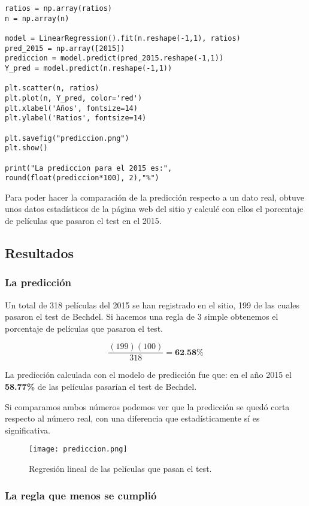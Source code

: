 \documentclass{article}
\begin{document}
\begin{lstlisting}
ratios = np.array(ratios)
n = np.array(n)

model = LinearRegression().fit(n.reshape(-1,1), ratios)
pred_2015 = np.array([2015]) 
prediccion = model.predict(pred_2015.reshape(-1,1))
Y_pred = model.predict(n.reshape(-1,1))

plt.scatter(n, ratios)
plt.plot(n, Y_pred, color='red')
plt.xlabel('Años', fontsize=14)
plt.ylabel('Ratios', fontsize=14)

plt.savefig("prediccion.png")
plt.show()

print("La prediccion para el 2015 es:",
round(float(prediccion*100), 2),"%")
\end{lstlisting}

Para poder hacer la comparación de la predicción respecto a un dato real, obtuve unos datos estadísticos de la página web del sitio \cite{pag} y calculé con ellos el porcentaje de películas que pasaron el test en el 2015.

\subsection{Resultados}\label{res}

\subsubsection{La predicción}

Un total de 318 películas del 2015 se han registrado en el sitio, 199 de las cuales pasaron el test de Bechdel. Si hacemos una regla de 3 simple obtenemos el porcentaje de películas que pasaron el test.

\begin{equation*}
    \frac{(199)(100)}{318} = \textbf{62.58\%}
\end{equation*}

La predicción calculada con el modelo de predicción fue que: en el año 2015 el \textbf{58.77\%} de las películas pasarían el test de Bechdel.

Si comparamos ambos números podemos ver que la predicción se quedó corta respecto al número real, con una diferencia que estadísticamente sí es significativa.

\begin{figure}[h!]
\centering
\texttt{[image: prediccion.png]}
\caption{\label{fig:pred}Regresión lineal de las películas que pasan el test.}
\end{figure}
\subsubsection{La regla que menos se cumplió}
\end{document}
